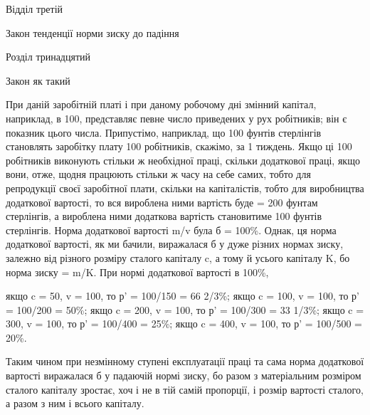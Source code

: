 Відділ третій

Закон тенденції норми зиску до падіння

Розділ тринадцятий

Закон як такий

При даній заробітній платі і при даному робочому дні змінний
капітал, наприклад, в 100, представляє певне число приведених
у рух робітників; він є показник цього числа. Припустімо,
наприклад, що 100 фунтів стерлінгів становлять заробітку плату
100 робітників, скажімо, за 1 тиждень. Якщо ці 100 робітників
виконують стільки ж необхідної праці, скільки додаткової праці,
якщо вони, отже, щодня працюють стільки ж часу на себе
самих, тобто для репродукції своєї заробітної плати, скільки
на капіталістів, тобто для виробництва додаткової вартості, то
вся вироблена ними вартість буде = 200 фунтам стерлінгів,
а вироблена ними додаткова вартість становитиме 100 фунтів
стерлінгів. Норма додаткової вартості m/v була б = 100\%. Однак,
ця норма додаткової вартості, як ми бачили, виражалася б у дуже
різних нормах зиску, залежно від різного розміру сталого капіталу
c, а тому й усього капіталу K, бо норма зиску = m/K. При нормі
додаткової вартості в 100\%,

якщо c = 50, v = 100, то р' = 100/150 = 66 2/3\%;
якщо c = 100, v = 100, то р' = 100/200 = 50\%;
якщо c = 200, v = 100, то р' = 100/300 = 33 1/3\%;
якщо c = 300, v = 100, то р' = 100/400 = 25\%;
якщо c = 400, v = 100, то р' = 100/500 = 20\%.

Таким чином при незмінному ступені експлуатації праці та
сама норма додаткової вартості виражалася б у падаючій нормі
зиску, бо разом з матеріальним розміром сталого капіталу зростає,
хоч і не в тій самій пропорції, і розмір вартості сталого,
а разом з ним і всього капіталу.

